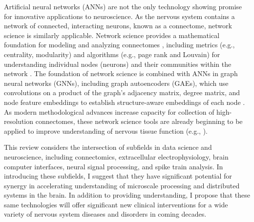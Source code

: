 \documentclass[11pt]{article}
\begin{document}
Artificial neural networks (ANNs) are not the only technology showing promise for innovative applications to neuroscience. As the nervous system contains a network of connected, interacting neurons, known as a connectome, network science is similarly applicable. Network science provides a mathematical foundation for modeling and analyzing connectomes \cite{emmons2015connectomics, easley2010networks, newman2010networks}, including metrics (e.g., centrality, modularity) and algorithms (e.g., page rank and Louvain) for understanding individual nodes (neurons) and their communities within the network \cite{easley2010networks, newman2010networks}. The foundation of network science is combined with ANNs in graph neural networks (GNNs), including graph autoencoders (GAEs), which use convolutions on a product of the graph's adjacency matrix, degree matrix, and node feature embeddings to establish structure-aware embeddings of each node \cite{velickovic2018graphattentionnetworks, kipf2016gae}. As modern methodological advances increase capacity for collection of high-resolution connectomes, these network science tools are already beginning to be applied to improve understanding of nervous tissue function (e.g., \cite{srinivasan2025gnnconnectome, neudorf2022gnnconnectome}).

This review considers the intersection of subfields in data science and neuroscience, including connectomics, extracellular electrophysiology, brain computer interfaces, neural signal processing, and spike train analysis. In introducing these subfields, I suggest that they have significant potential for synergy in accelerating understanding of microscale processing and distributed systems in the brain. In addition to providing understanding, I propose that these same technologies will offer significant new clinical interventions for a wide variety of nervous system diseases and disorders in coming decades.
\end{document}
